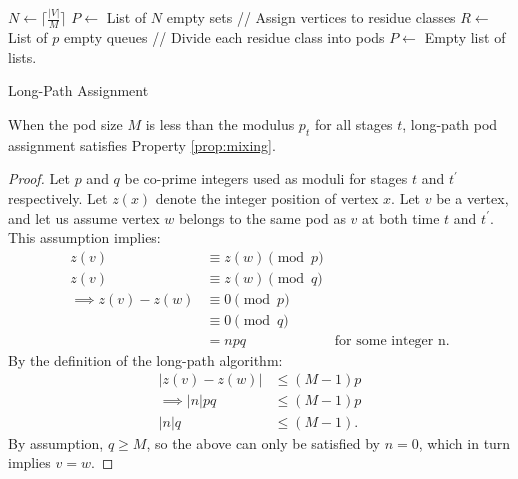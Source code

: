 \begin{algorithm}
\SetAlgoLined
\DontPrintSemicolon
{}
    $N \longleftarrow \lceil \frac{|V|}{M} \rceil$ \;
    $P \longleftarrow$ List of $N$ empty sets \;
    // Assign vertices to residue classes \;
    $R \longleftarrow$ List of $p$ empty queues \;     
    // Divide each residue class into pods \;
    $P \longleftarrow $ Empty list of lists. \;
\caption{Long-Path Assignment}
\label{alg:long}
\end{algorithm}


\begin{claim}
When the pod size $M$ is less than the modulus $p_t$ for all stages $t$, long-path pod assignment satisfies Property \ref{prop:mixing}.
\end{claim}

\begin{proof}
Let $p$ and $q$ be co-prime integers used as moduli for stages $t$ and $t^\prime$ respectively.
Let $z(x)$ denote the integer position of vertex $x$.
Let $v$ be a vertex, and let us assume vertex $w$ belongs to the same pod as $v$ at both time $t$ and $t^\prime$.
This assumption implies:
\begin{align*}
    z(v) &\equiv z(w) \pmod{p} \\
    z(v) &\equiv z(w) \pmod{q} \\
    \implies z(v) - z(w) &\equiv 0 \pmod{p} \\
    &\equiv 0 \pmod{q} \\
    &= npq & \text{for some integer n}.
\end{align*}
By the definition of the long-path algorithm:
\begin{align*}
    |z(v)-z(w)| & \leq (M - 1)p \\
    \implies |n|pq & \leq (M - 1)p \\
    |n|q & \leq (M - 1).
\end{align*}
By assumption, $q \geq M$, so the above can only be satisfied by $n=0$,
which in turn implies $v=w$. \qedhere
\end{proof}


